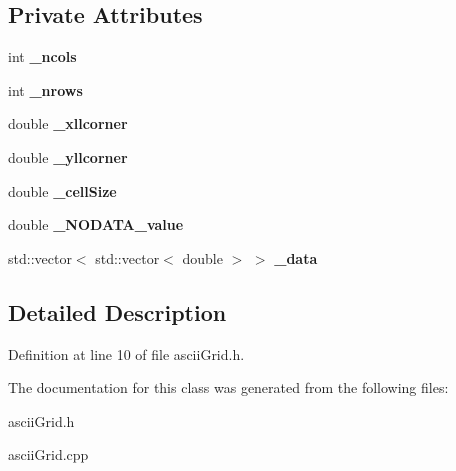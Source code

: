 \subsection*{Private Attributes}
\begin{DoxyCompactItemize}
\item 
\mbox{\label{classasciiGrid_a954aec05c9ed74b69460f98365d71d04}} 
int {\bfseries \+\_\+ncols}
\item 
\mbox{\label{classasciiGrid_ab97218c7133b2aafb78f87f3daa7b1bb}} 
int {\bfseries \+\_\+nrows}
\item 
\mbox{\label{classasciiGrid_a5aba0243eeede7d3f475ca4673a19091}} 
double {\bfseries \+\_\+xllcorner}
\item 
\mbox{\label{classasciiGrid_a2915f11c96cd5a1fe8c76db4ffd8248e}} 
double {\bfseries \+\_\+yllcorner}
\item 
\mbox{\label{classasciiGrid_a687ba652659479667ef3fc1d271d20d8}} 
double {\bfseries \+\_\+cell\+Size}
\item 
\mbox{\label{classasciiGrid_a49c1ae436ffa8cf9f2f8417fb3111b6d}} 
double {\bfseries \+\_\+\+N\+O\+D\+A\+T\+A\+\_\+value}
\item 
\mbox{\label{classasciiGrid_a1f782a61625fc19e25c469469f8e886e}} 
std\+::vector$<$ std\+::vector$<$ double $>$ $>$ {\bfseries \+\_\+data}
\end{DoxyCompactItemize}


\subsection{Detailed Description}


Definition at line 10 of file ascii\+Grid.\+h.



The documentation for this class was generated from the following files\+:\begin{DoxyCompactItemize}
\item 
ascii\+Grid.\+h\item 
ascii\+Grid.\+cpp\end{DoxyCompactItemize}
